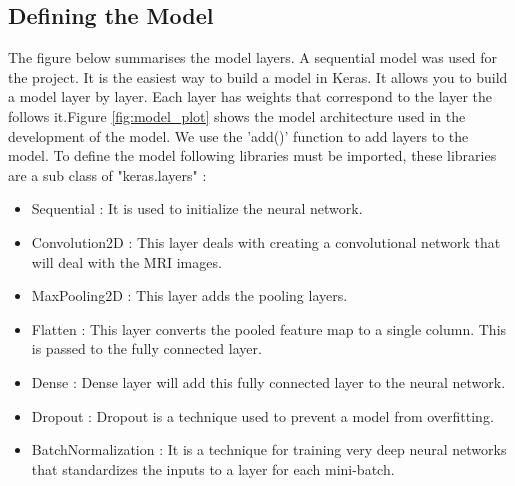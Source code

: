 \subsection{Defining the Model}
The figure below summarises the model layers. A sequential model was used for the project. It is the easiest way to build a model in Keras. It allows you to build a model layer by layer. Each layer has weights that correspond to the layer the follows it.Figure \ref{fig:model_plot} shows the model architecture used in the development of the model. We use the 'add()' function to add layers to the model. To define the model following libraries must be imported, these libraries are a sub class of "keras.layers" :
\begin{itemize}
    \item Sequential : It is used to initialize the neural network.
    \item Convolution2D : This layer deals with creating a convolutional network that will deal with the MRI images.
    \item MaxPooling2D : This layer adds the pooling layers.
    \item Flatten : This layer converts the pooled feature map to a single column. This is passed to the fully connected layer.
    \item Dense : Dense layer will add this fully connected layer to the neural network.
    \item Dropout : Dropout is a technique used to prevent a model from overfitting.
    \item BatchNormalization : It is a technique for training very deep neural networks that standardizes the inputs to a layer for each mini-batch.
\end{itemize}

